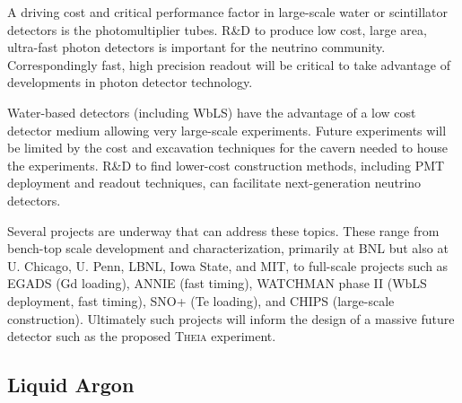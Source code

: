 A driving cost and critical performance factor in large-scale water or scintillator detectors is the photomultiplier tubes. R\&D to produce low cost, large area, ultra-fast photon detectors is important for the neutrino community. Correspondingly fast, high precision readout will be critical to take advantage of developments in photon detector technology.  

Water-based detectors (including WbLS) have the advantage of a low cost detector medium allowing very large-scale experiments. Future experiments will be limited by the cost and excavation techniques for the cavern needed to house the experiments. R\&D to find lower-cost construction methods, including PMT deployment and readout techniques, can facilitate next-generation neutrino detectors. 

Several projects are underway that can address these topics.  These range from bench-top scale development and characterization, primarily at BNL but also at U. Chicago, U. Penn, LBNL, Iowa State, and MIT, to full-scale projects such as EGADS (Gd loading), ANNIE (fast timing), WATCHMAN phase II (WbLS deployment, fast timing), SNO+ (Te loading), and CHIPS (large-scale construction).  Ultimately such projects will inform the design of a massive future detector such as the proposed \textsc{Theia} experiment.



\subsection{Liquid Argon}

